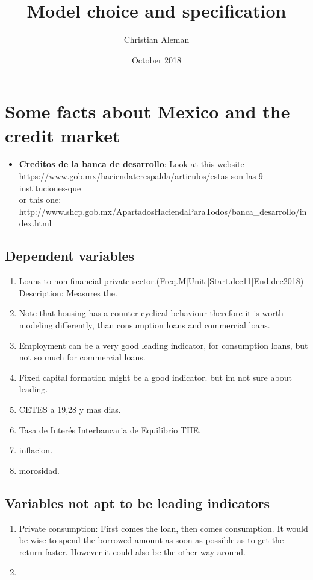 \documentclass{article}
\title{Model choice and specification}
\author{Christian Aleman}
\date{October 2018}
\begin{document}
\maketitle
\section{Some facts about Mexico and the credit market}
\begin{itemize}
    \item \textbf{Creditos de la banca de desarrollo}: Look at this website\\ https://www.gob.mx/haciendaterespalda/articulos/estas-son-las-9-instituciones-que\\
    or this one:\\
    http://www.shcp.gob.mx/ApartadosHaciendaParaTodos/banca_desarrollo/index.html
\end{itemize}
\subsection*{Dependent variables}

\begin{enumerate}
    \item Loans to non-financial private sector.(Freq.M|Unit:|Start.dec11|End.dec2018)\\
    Description: Measures the.
    \item Note that housing has a counter cyclical behaviour therefore it is worth modeling differently, than consumption loans and commercial loans.
    \item Employment can be a very good leading indicator, for consumption loans, but not so much for commercial loans.
    \item Fixed capital formation might be a good indicator. but im not sure about leading.
    \item CETES a 19,28 y mas dias.
    \item Tasa de Interés Interbancaria de Equilibrio TIIE.
    \item inflacion.
    \item morosidad.
\end{enumerate}

\subsection*{Variables not apt to be leading indicators}
\begin{enumerate}
    \item Private consumption: First comes the loan, then comes consumption. It would be wise to spend the borrowed amount as soon as possible as to get the return faster. However it could also be the other way around.
    \item 
\end{enumerate}

\begin{comment}
\subsection*{Independent variables \footnote{Not true because if I'm doing a VAR all are dependent variables.}}
\begin{enumerate}
    \item Loans to non-financial private sector.
\end{enumerate}
\end{comment}
\end{document}
